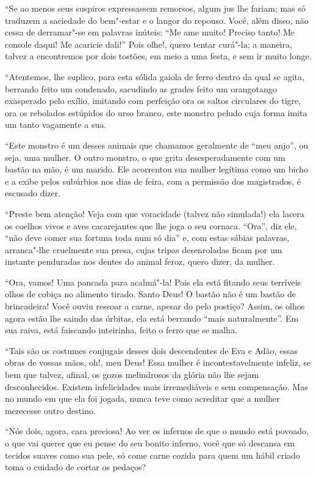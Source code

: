 “Se ao menos seus suspiros expressassem remorsos, algum
jus lhe fariam; mas só traduzem a saciedade do bem"-estar e o
langor do repouso. Você, além disso, não cessa de derramar"-se em
palavras inúteis: ``Me ame muito! Preciso tanto! Me
console daqui! Me acaricie dali!'' Pois olhe!, quero tentar
curá"-la; a maneira, talvez a encontremos por dois tostões, em meio a
uma festa, e sem ir muito longe.

“Atentemos, lhe suplico, para esta sólida gaiola de
ferro dentro da qual se agita, berrando feito um condenado, sacudindo
as grades feito um orangotango exasperado pelo exílio, imitando com
perfeição ora os saltos circulares do tigre, ora os rebolados
estúpidos do urso branco, este monstro peludo cuja forma imita um tanto
vagamente a sua.

“Este monstro é um desses animais que chamamos geralmente
de ``meu anjo'', ou seja, uma mulher. O outro
monstro, o que grita desesperadamente com um bastão na mão, é um
marido. Ele acorrentou sua mulher legítima como um bicho e a exibe
pelos subúrbios nos dias de feira, com a permissão dos magistrados, é
escusado dizer.

\quebra

“Preste bem atenção! Veja com que voracidade (talvez não
simulada!) ela lacera os coelhos vivos e aves cacarejantes que lhe joga o
seu cornaca. ``Ora'', diz ele, ``não deve comer sua fortuna toda num só
dia'' e, com estas sábias palavras, arranca"-lhe
cruelmente sua presa, cujas tripas desenroladas ficam por um instante
penduradas nos dentes do animal feroz, quero dizer, da mulher.

“Ora, vamos! Uma pancada para acalmá"-la! Pois ela está fitando
seus terríveis olhos de cobiça no alimento tirado. Santo Deus! O bastão
não é um bastão de brincadeira! Você ouviu ressoar a carne, apesar do
pelo postiço? Assim, os olhos agora estão lhe saindo das órbitas, ela
está berrando ``mais naturalmente''. Em sua raiva, está faiscando
inteirinha, feito o ferro que se malha.

“Tais são os costumes conjugais desses dois descendentes
de Eva e Adão, essas obras de vossas mãos, oh!, meu Deus! Essa mulher
é incontestavelmente infeliz, se bem que talvez, afinal, os
gozos melindrosos da glória não lhe sejam desconhecidos. Existem
infelicidades mais irremediáveis e sem compensação. Mas no mundo em
que ela foi jogada, nunca teve como acreditar que a mulher merecesse
outro destino.

“Nós dois, agora, cara preciosa! Ao ver os infernos de que
o mundo está povoado, o que vai querer que eu pense do seu bonito
inferno, você que só descansa em tecidos suaves como sua pele,
só come carne cozida para quem um hábil criado toma o
cuidado de cortar os pedaços?

